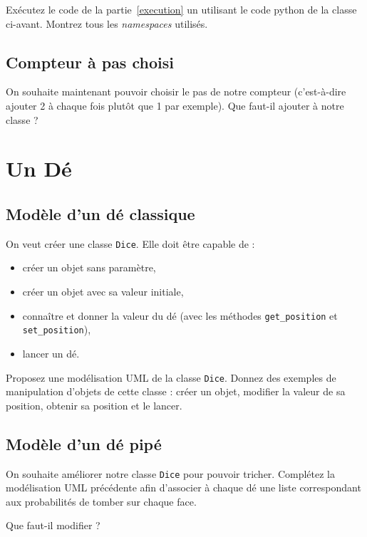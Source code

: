 \documentclass[12pt]{article}
\begin{document}
Exécutez le code de la partie~\ref{execution} un utilisant le code python de la classe ci-avant. Montrez tous les {\em namespaces} utilisés.


\subsection{Compteur à pas choisi}
On souhaite maintenant pouvoir choisir le pas de notre compteur (c'est-à-dire ajouter 2 à chaque fois plutôt que 1 par
exemple). Que faut-il ajouter à notre classe ?


\section{Un Dé}

\subsection{Modèle d'un dé classique}

On veut créer une classe \verb|Dice|. Elle doit être capable de :
\begin{itemize}
	\item créer un objet sans paramètre,
	\item créer un objet avec sa valeur initiale,
	\item connaître et donner la valeur du dé (avec les méthodes \verb|get_position| et \verb|set_position|),
	\item lancer un dé.
\end{itemize}

Proposez une modélisation UML de la classe \verb|Dice|. Donnez des exemples de manipulation d'objets de cette classe :
créer un objet, modifier la valeur de sa position, obtenir sa position et le lancer.

\subsection{Modèle d'un dé pipé}

On souhaite améliorer notre classe \verb|Dice| pour pouvoir tricher. Complétez la modélisation UML précédente afin
d'associer à chaque dé une liste correspondant aux probabilités de tomber sur chaque face.

Que faut-il modifier ?
\end{document}
